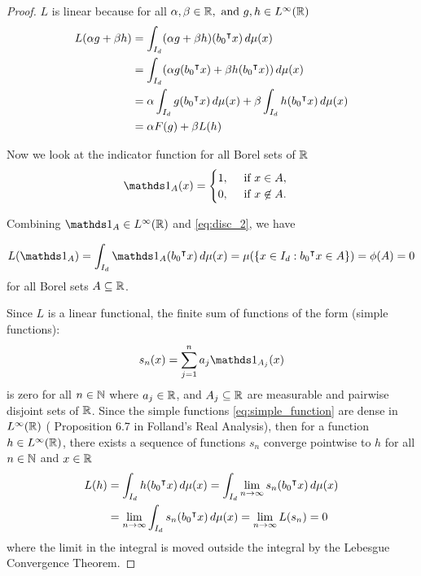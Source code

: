 \begin{proof}
    $L$ is linear because for all $\alpha, \beta \in \mathbb{R}, \text{ and } g, h \in
    L^{\infty}(\mathbb{R})$
    \begin{align*}
        L(\alpha g + \beta h)
        &= \int_{I_d} (\alpha g + \beta h) (b_0{}^{\intercal} x) \,d\mu(x) \\
        &= \int_{I_d} (\alpha g(b_0{}^{\intercal} x) + \beta h (b_0{}^{\intercal} x)) \, d\mu(x) \\
        &= \alpha \int_{I_d} g(b_0{}^{\intercal} x) \,d\mu(x) 
            + \beta \int_{I_d} h(b_0{}^{\intercal} x) \,d\mu(x) \\
        &= \alpha F(g) + \beta L(h)
    \end{align*}

    Now we look at the indicator function for all Borel sets of $\mathbb{R}$
    \begin{equation}
        \indicator{A}(x) =
        \begin{cases}
            1, \quad \text{ if } x \in A, \\
            0, \quad \text{ if } x \not\in A.
        \end{cases}
    \end{equation}

    Combining $\indicator{A} \in \lp{\infty}(\R)$ and \eqref{eq:disc_2}, we
    have 

    \begin{equation}
        L(\indicator{A}) = \int_{I_d} \indicator{A}(b_0\tr x)\,d\mu(x)
        = \mu(\{ x\in I_d: b_0\tr x\in A \}) = \phi(A) = 0
    \end{equation}
    for all Borel sets $A \subseteq \mathbb{R}$.

    Since $L$ is a linear functional, the finite sum of functions of the form
    (simple functions):
    \begin{equation}
        \label{eq:simple_function}
        s_n(x) = \sum_{j=1}^{n} a_j \indicator{A_j}(x)
    \end{equation}
    is zero for all $n\in\mathbb{N}$ where $a_j \in \mathbb{R}$, and ${A_j} \subseteq \mathbb{R}$ are
    measurable and pairwise disjoint sets of $\mathbb{R}$. Since the simple functions
    \eqref{eq:simple_function} are dense in $L^{\infty}(\mathbb{R})$ (\TOCITE
    Proposition 6.7 in Folland's Real Analysis), then for a function $h \in
    L^{\infty}(\mathbb{R})$, there exists a sequence of functions $s_n$ converge
    pointwise to $h$ for all $n \in \mathbb{N}$ and $x \in \mathbb{R}$
    \begin{align}
        L(h) &= \int_{I_d} h(b_0{}^{\intercal} x) \,d\mu(x) 
             = \int_{I_d} \lim_{n\to\infty} s_n(b_0{}^{\intercal} x) \,d\mu(x) \\
             &= \lim_{n\to\infty} \int_{I_d} s_n(b_0{}^{\intercal} x) \,d\mu(x)
             = \lim_{n\to\infty} L(s_n)
             = 0
    \end{align}
    where the limit in the integral is moved outside the integral by the
    Lebesgue Convergence Theorem.


\end{proof}
